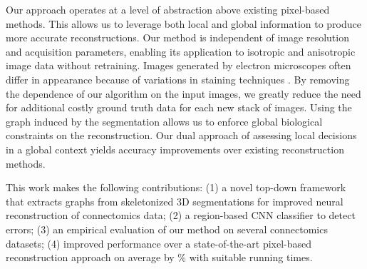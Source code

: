 Our approach operates at a level of abstraction above existing pixel-based methods. 
This allows us to leverage both local and global information to produce more accurate reconstructions. 
Our method is independent of image resolution and acquisition parameters, enabling its application to isotropic and anisotropic image data without retraining.
Images generated by electron microscopes often differ in appearance because of variations in staining techniques \cite{briggman2012volume}.
By removing the dependence of our algorithm on the input images, we greatly reduce the need for additional costly ground truth data for each new stack of images.
Using the graph induced by the segmentation allows us to enforce global biological constraints on the reconstruction. 
Our dual approach of assessing local decisions in a global context yields accuracy improvements over existing reconstruction methods.

This work makes the following contributions: (1) a novel top-down framework that extracts graphs from skeletonized 3D segmentations for improved neural reconstruction of connectomics data; (2) a region-based CNN classifier to detect errors; (3) an empirical evaluation of our method on several connectomics datasets; (4) improved performance over a state-of-the-art pixel-based reconstruction approach on average by \% with suitable running times.
